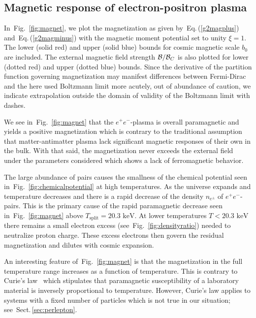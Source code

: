 \documentclass[aps,prd,floatfix,reprint]{revtex4-2}
\newcommand*{\keV}{\text{ keV}}
\newcommand{\req}[1]{Eq.\,(\ref{#1})}
\newcommand{\rf}[1]{Fig.~{\ref{#1}}}
\newcommand{\rsec}[1]{Sect.\,{\ref{#1}}}
\begin{document}
\subsection{Magnetic response of electron-positron plasma}
\label{sec:paramagnetism}
\noindent In~\rf{fig:magnet}, we plot the magnetization as given by~\req{g2magplus} and~\req{g2magminus} with the magnetic moment potential set to unity $\xi=1$. The lower (solid red) and upper (solid blue) bounds for cosmic magnetic scale $b_{0}$ are included. The external magnetic field strength ${\cal B}/{\cal B}_{C}$ is also plotted for lower (dotted red) and upper (dotted blue) bounds. Since the derivative of the partition function governing magnetization may manifest differences between Fermi-Dirac and the here used Boltzmann limit more acutely, out of abundance of caution, we indicate extrapolation outside the domain of validity of the Boltzmann limit with dashes.

We see in~\rf{fig:magnet} that the $e^{+}e^{-}$-plasma is overall paramagnetic and yields a positive magnetization which is contrary to the traditional assumption that matter-antimatter plasma lack significant magnetic responses of their own in the bulk. With that said, the magnetization never exceeds the external field under the parameters considered which shows a lack of ferromagnetic behavior. 

The large abundance of pairs causes the smallness of the chemical potential seen in~\rf{fig:chemicalpotential} at high temperatures. As the universe expands and temperature decreases and there is a rapid decrease of the density $n_{e^{\pm}}$ of $e^{+}e^{-}$-pairs. This is the primary cause of the rapid paramagnetic decrease seen in~\rf{fig:magnet} above $T_\mathrm{split}=20.3\keV$. At lower temperatures $T<20.3\keV$ there remains a small electron excess (see~\rf{fig:densityratio}) needed to neutralize proton charge. These excess electrons then govern the residual magnetization and dilutes with cosmic expansion.

An interesting feature of~\rf{fig:magnet} is that the magnetization in the full temperature range increases as a function of temperature. This is contrary to Curie's law~\cite{greiner2012thermodynamics} which stipulates that paramagnetic susceptibility of a laboratory material is inversely proportional to temperature. However, Curie's law applies to systems with a fixed number of particles which is not true in our situation; see~\rsec{sec:perlepton}.
\end{document}
